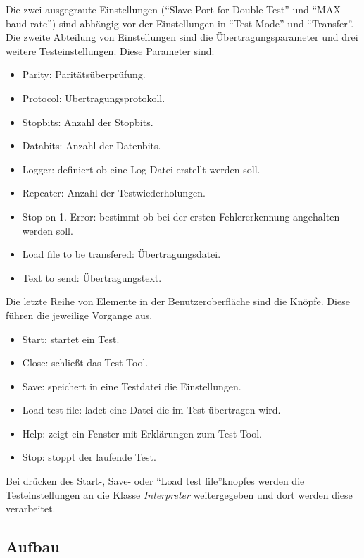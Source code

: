 Die zwei ausgegraute Einstellungen ("`Slave Port for Double Test"' und "`MAX baud rate"') sind abhängig vor der Einstellungen in "`Test Mode"' und "`Transfer"'.\\

Die zweite Abteilung von Einstellungen sind die Übertragungsparameter und drei weitere Testeinstellungen. Diese Parameter sind:

\begin{itemize}
\item Parity: Paritätsüberprüfung.
\item Protocol: Übertragungsprotokoll.
\item Stopbits: Anzahl der Stopbits.
\item Databits: Anzahl der Datenbits.
\item Logger: definiert ob eine Log-Datei erstellt werden soll.
\item Repeater: Anzahl der Testwiederholungen.
\item Stop on 1. Error: bestimmt ob bei der ersten Fehlererkennung angehalten werden soll.
\item Load file to be transfered: Übertragungsdatei.
\item Text to send: Übertragungstext.\\
\end{itemize}

Die letzte Reihe von Elemente in der Benutzeroberfläche sind die Knöpfe. Diese führen die jeweilige Vorgange aus.

\begin{itemize}
\item Start: startet ein Test.
\item Close: schließt das Test Tool.
\item Save: speichert in eine Testdatei die Einstellungen.
\item Load test file: ladet eine Datei die im Test übertragen wird.
\item Help: zeigt ein Fenster mit Erklärungen zum Test Tool.
\item Stop: stoppt der laufende Test.\\
\end{itemize}

Bei drücken des Start-, Save- oder "`Load test file"'knopfes werden die Testeinstellungen an die Klasse \textit{Interpreter} weitergegeben und dort werden diese verarbeitet.


\subsection{Aufbau}
